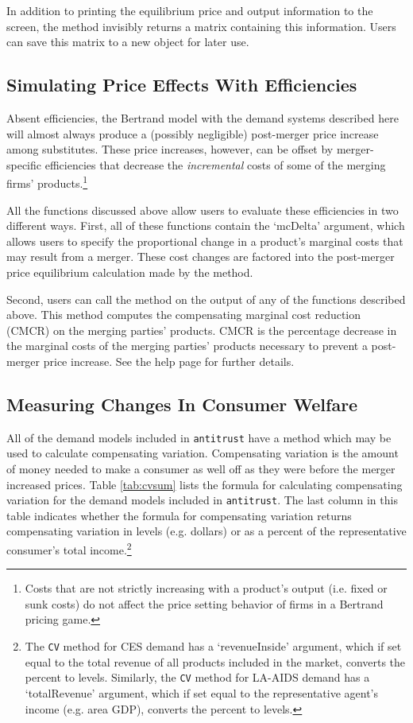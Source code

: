 \documentclass[11pt,numbers=noenddot,pointlessnumbers]{scrreprt}
\newcommand{\atr}{{\tt antitrust}}
\numberwithin{equation}{section}
\begin{document}
In addition to printing the equilibrium price and output information
to the screen, the \verb@summary@ method invisibly returns a matrix
containing this information. Users can save this matrix to a new
object for later use.

\subsection{Simulating Price Effects With Efficiencies}
Absent efficiencies, the Bertrand model with the demand systems
described here will almost always produce a (possibly negligible)
post-merger price increase among substitutes. These price increases, however, can be
offset by merger-specific efficiencies that decrease the \emph{incremental}
costs of some of the merging firms' products.\footnote{Costs that are
  not strictly increasing with a product's output (i.e. fixed or sunk
  costs) do not affect the price setting behavior of firms in a
  Bertrand pricing game. }

All the functions discussed above allow users to evaluate these
efficiencies in two different ways. First, all of these functions
contain the `mcDelta' argument, which allows users to specify the
proportional change in a product's marginal costs that may result from
a merger. These cost changes are factored into the
post-merger price equilibrium calculation made by the
\verb@calcPrices@ method.

Second, users can call the \verb@cmcr@ method on the output of any
of the functions described above. This method computes the
compensating marginal cost reduction (CMCR) on the merging parties'
products. CMCR is the percentage decrease in the marginal costs of
the merging parties' products necessary to prevent a post-merger price
increase. See the \verb@cmcr@ help page for further details.

\subsection{Measuring Changes In Consumer Welfare}
All of the demand models included in \atr{} have a \verb@CV@ method
which may be used to
calculate compensating variation. Compensating variation is the amount of money needed to
make a consumer as well off as they were before the merger increased
prices.  Table \ref{tab:cvsum} lists the formula for calculating compensating
variation for the demand models included in \atr{}. The last column in
this table indicates whether the formula for compensating variation
returns compensating variation in levels (e.g. dollars) or as a percent of the
representative consumer's total income.\footnote{The \texttt{CV} method
for CES demand has a `revenueInside' argument, which if set equal to
the total revenue of all products included in the market, converts the
percent to levels. Similarly, the \texttt{CV} method
for LA-AIDS demand has a `totalRevenue' argument, which if set equal to
the representative agent's income (e.g. area GDP), converts the
percent to levels.}
\end{document}
